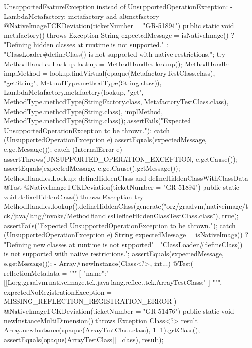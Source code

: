 UnsupportedFeatureException instead of UnsupportedOperationException:
- LambdaMetafactory: metafactory and altmetfactory
@NativeImageTCKDeviation(ticketNumber = "GR-51894")
public static void metafactory() throws Exception {
    String expectedMessage = isNativeImage()
            ? "Defining hidden classes at runtime is not supported."
            : "ClassLoader#defineClass() is not supported with native restrictions.";
    try {
        MethodHandles.Lookup lookup = MethodHandles.lookup();
        MethodHandle implMethod = lookup.findVirtual(opaque(MetafactoryTestClass.class), "getString", MethodType.methodType(String.class));
        LambdaMetafactory.metafactory(lookup, "get", MethodType.methodType(StringFactory.class, MetafactoryTestClass.class), MethodType.methodType(String.class),
                implMethod, MethodType.methodType(String.class));
        assertFails("Expected UnsupportedOperationException to be thrown.");
    } catch (UnsupportedOperationException e) {
        assertEquals(expectedMessage, e.getMessage());
    } catch (InternalError e) {
        assertThrows(UNSUPPORTED_OPERATION_EXCEPTION, e.getCause());
        assertEquals(expectedMessage, e.getCause().getMessage());
    }
}
- MethodHandles.Lookup: defineHiddenClass and defineHiddenClassWithClassData
@Test
@NativeImageTCKDeviation(ticketNumber = "GR-51894")
public static void defineHiddenClass() throws Exception {
    try {
        MethodHandles.lookup().defineHiddenClass(generate("org/graalvm/nativeimage/tck/java/lang/invoke/MethodHandlesDefineHiddenClassTestClass.class"), true);
        assertFails("Expected UnsupportedOperationException to be thrown.");
    } catch (UnsupportedOperationException e) {
        String expectedMessage = isNativeImage()
                ? "Defining new classes at runtime is not supported"
                : "ClassLoader#defineClass() is not supported with native restrictions.";
        assertEquals(expectedMessage, e.getMessage());
    }
}
- Array#newInstance(Class<?>, int...)
@Test(
        reflectionMetadata =
                """
                [{
                    "name":"[[Lorg.graalvm.nativeimage.tck.java.lang.reflect.tck.ArrayTestClass;"
                }]
                """,
        expectedNoRegistrationException = MISSING_REFLECTION_REGISTRATION_ERROR
)
@NativeImageTCKDeviation(ticketNumber = "GR-51476")
public static void newInstanceMultiDimension() throws Exception {
    Class<?> result = Array.newInstance(opaque(ArrayTestClass.class), 1, 1).getClass();
    assertEquals(opaque(ArrayTestClass[][].class), result);
}

